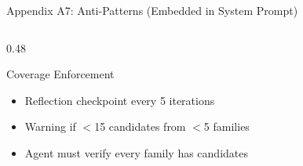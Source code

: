 \documentclass[aspectratio=169, 11pt]{beamer}
\begin{document}
\begin{frame}{Appendix A7: Anti-Patterns (Embedded in System Prompt)}
\begin{columns}[T]
\begin{column}{0.48\textwidth}
\vspace{2pt}
\begin{exampleblock}{\small Coverage Enforcement}
\vspace{-2pt}
\begin{itemize}\scriptsize
\setlength\itemsep{0pt}
\item Reflection checkpoint every 5 iterations
\item Warning if $<$15 candidates from $<$5 families
\item Agent must verify every family has candidates
\end{itemize}
\end{exampleblock}
\end{column}
\end{columns}
\end{frame}
\end{document}
